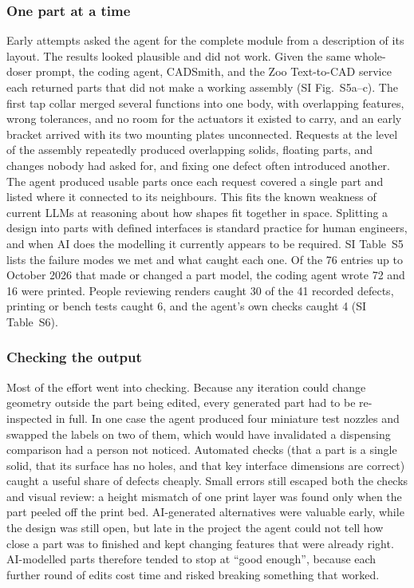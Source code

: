 \documentclass[twoside,twocolumn,9pt]{article}
\begin{document}
\subsubsection{One part at a time}
Early attempts asked the agent for the complete module from a description of its layout. The results looked plausible and did not work. Given the same whole-doser prompt, the coding agent, CADSmith, and the Zoo Text-to-CAD service each returned parts that did not make a working assembly (SI Fig.~S5a--c). The first tap collar merged several functions into one body, with overlapping features, wrong tolerances, and no room for the actuators it existed to carry, and an early bracket arrived with its two mounting plates unconnected. Requests at the level of the assembly repeatedly produced overlapping solids, floating parts, and changes nobody had asked for, and fixing one defect often introduced another. The agent produced usable parts once each request covered a single part and listed where it connected to its neighbours. This fits the known weakness of current LLMs at reasoning about how shapes fit together in space.\cite{Alrashedy2025Generating} Splitting a design into parts with defined interfaces is standard practice for human engineers, and when AI does the modelling it currently appears to be required. SI Table~S5 lists the failure modes we met and what caught each one. Of the 76 entries up to October 2026 that made or changed a part model, the coding agent wrote 72 and 16 were printed. People reviewing renders caught 30 of the 41 recorded defects, printing or bench tests caught 6, and the agent's own checks caught 4 (SI Table~S6).

\subsubsection{Checking the output}
Most of the effort went into checking. Because any iteration could change geometry outside the part being edited, every generated part had to be re-inspected in full. In one case the agent produced four miniature test nozzles and swapped the labels on two of them, which would have invalidated a dispensing comparison had a person not noticed. Automated checks (that a part is a single solid, that its surface has no holes, and that key interface dimensions are correct) caught a useful share of defects cheaply. Small errors still escaped both the checks and visual review: a height mismatch of one print layer was found only when the part peeled off the print bed. AI-generated alternatives were valuable early, while the design was still open, but late in the project the agent could not tell how close a part was to finished and kept changing features that were already right. AI-modelled parts therefore tended to stop at ``good enough'', because each further round of edits cost time and risked breaking something that worked.
\end{document}
